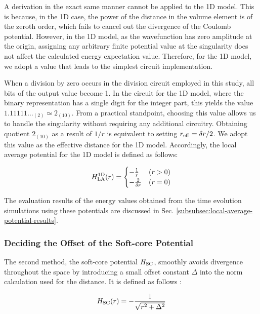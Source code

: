\documentclass[aip-draft.tex]{subfiles}
\begin{document}
A derivation in the exact same manner cannot be applied to the 1D model. This is
because, in the 1D case, the power of the distance in the volume element is of
the zeroth order, which fails to cancel out the divergence of the Coulomb
potential. However, in the 1D model, as the wavefunction has zero amplitude at
the origin, assigning any arbitrary finite potential value at the singularity
does not affect the calculated energy expectation value. Therefore, for the 1D
model, we adopt a value that leads to the simplest circuit implementation.

When a division by zero occurs in the division circuit employed in this study,
all bits of the output value become 1. In the circuit for the 1D model, where
the binary representation has a single digit for the integer part, this yields
the value $1.11111\dots_{(2)} \simeq 2_{(10)}$. From a practical standpoint,
choosing this value allows us to handle the singularity without requiring any
additional circuitry. Obtaining quotient $2_{(10)}$ as a result of $1/r$ is
equivalent to setting $r_{\mathrm{eff}} = \delta r/2$. We adopt this value as the effective
distance for the 1D model. Accordingly, the local average potential for the 1D
model is defined as follows:

\begin{equation}
H_{\mathrm{LA}}^{\mathrm{1D}}(r) = \begin{cases}
-\frac{1}{r} & (r>0) \\
-\frac{2}{\delta r} & (r=0)
\end{cases}
\label{eq:Hlar1d-fixed}
\end{equation}

The evaluation results of the energy values obtained from the time evolution
simulations using these potentials are discussed in Sec.
\ref{subsubsec:local-average-potential-results}.

\subsubsection{Deciding the Offset of the Soft-core Potential}
\label{subsubsec:deciding-offset-of-soft-core-potential}

The second method, the soft-core potential $H_{\mathrm{SC}}$, smoothly avoids divergence
throughout the space by introducing a small offset constant $\Delta$ into the
norm calculation used for the distance. It is defined as follows
\cite{Kivlichan_2017}:

\begin{equation}
H_{\mathrm{SC}}(r) = -\frac{1}{\sqrt{r^2+\Delta^2}}
\label{eq:Hsc2r}
\end{equation}
\end{document}
